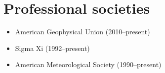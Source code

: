 \section{Professional societies}
\vspace{0.5em}

\begin{itemize}
  \item American Geophysical Union (2010--present) 
  \item Sigma Xi (1992--present)
  \item American Meteorological Society (1990--present)
\end{itemize}
